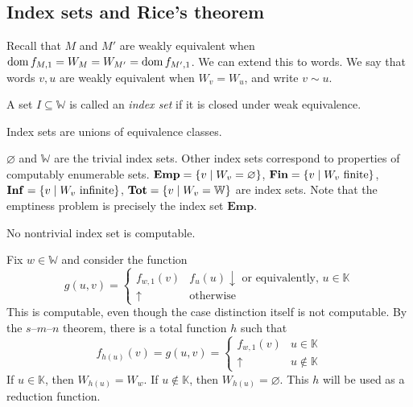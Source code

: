 \subsection{Index sets and Rice's theorem}
Recall that \( M \) and \( M' \) are weakly equivalent when \( \operatorname{dom} f_{M,1} = W_M = W_{M'} = \operatorname{dom} f_{M',1} \).
We can extend this to words.
We say that words \( v, u \) are weakly equivalent when \( W_v = W_u \), and write \( v \sim u \).
\begin{definition}
	A set \( I \subseteq \mathbb W \) is called an \emph{index set} if it is closed under weak equivalence.
\end{definition}
\begin{remark}
	Index sets are unions of equivalence classes.
\end{remark}
\begin{example}
	\( \varnothing \) and \( \mathbb W \) are the trivial index sets.
	Other index sets correspond to properties of computably enumerable sets.
	\( \bm{\mathrm{Emp}} = \qty{v \mid W_v = \varnothing} \), \( \bm{\mathrm{Fin}} = \qty{v \mid W_v \text{ finite}} \), \( \bm{\mathrm{Inf}} = \qty{v \mid W_v \text{ infinite}} \), \( \bm{\mathrm{Tot}} = \qty{v \mid W_v = \mathbb W} \) are index sets.
	Note that the emptiness problem is precisely the index set \( \mathbf{Emp} \).
\end{example}
\begin{theorem}
	No nontrivial index set is computable.
\end{theorem}
Fix \( w \in \mathbb W \) and consider the function
\[ g(u,v) = \begin{cases}
	f_{w,1}(v) & f_u(u) \downarrow \text{ or equivalently, } u \in \mathbb K \\
	\uparrow & \text{otherwise}
\end{cases} \]
This is computable, even though the case distinction itself is not computable.
By the \( s \)--\( m \)--\( n \) theorem, there is a total function \( h \) such that
\[ f_{h(u)}(v) = g(u,v) = \begin{cases}
	f_{w,1}(v) & u \in \mathbb K \\
	\uparrow & u \not\in \mathbb K
\end{cases} \]
If \( u \in \mathbb K \), then \( W_{h(u)} = W_w \).
If \( u \not\in \mathbb K \), then \( W_{h(u)} = \varnothing \).
This \( h \) will be used as a reduction function.
